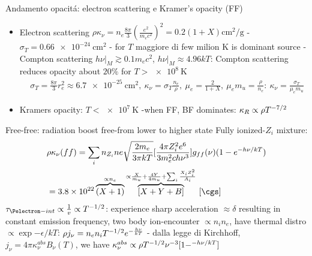\begin{frame}{Andamento opacit\'a: electron scattering e Kramer's opacity (FF)}
\begin{itemize}
\item Electron scattering $\rho\kappa_{\nu}=n_e\frac{8\pi}{3}(\frac{e^2}{m_ec^2})^2=0.2(1+X)\si{\square\cm\per\gram}$ - $\sigma_T=\SI{0.66e-24}{\square\cm}$ - for $T$ maggiore di few milion K is dominant source - Compton scattering $h\nu|_M\gtrsim0.1 m_ec^2$, $h\nu|_M\approx4.96kT$: Compton scattering reduces opacity about $20\%$ for $T>\SI{e8}{\kelvin}$
    \begin{align*}
        &\sigma_T=\frac{8\pi}{3}r_e^2\approx\SI{6.7e-25}{\square\cm},\ \kappa_{\nu}=\sigma_T \frac{n_e}{\rho},\ \mu_e=\frac{2}{1+X},\ \mu_em_u=\frac{\rho}{n_e}:\ \kappa_{\nu}=\frac{\sigma_T}{\mu_em_u}
    \end{align*}
\item Kramers opacity: $T<\SI{e7}{\kelvin}$ -when FF, BF dominates: $\kappa_R\propto\rho T^{-7/2}$
\end{itemize}
\begin{block}{Free-free: radiation boost free-\Pelectron from lower to higher state}
Fully ionized-$Z_i$ mixture: 
\begin{align*}
&\rho\kappa_{\nu}(ff)=\sum_in_{Z_i}ne\sqrt{\frac{2m_e}{3\pi kT}}[\frac{4\pi Z_i^2e^6}{3m_e^2ch\nu^3}]g_{ff}(\nu)(1-\exp{-h\nu/kT})\\
&=\num{3.8e22}\overbrace{(X+1)}^{\propto n_e}\overbrace{[X+Y+B]}^{\propto\frac{X}{m_u}+\frac{4Y}{4m_u}+\sum_i\frac{X_iZ_i^2}{A_i}}\ [\si{\cgs}]
\end{align*}
$\tau_{\Pelectron-int}\propto\frac{1}{v}\propto T\expy{-1/2}$: \Pelectron experience sharp acceleration $\approx\delta$ resulting in constant emission frequency, two body ion-\Pelectron encounter $\propto n_in_e$, \Pelectron have thermal distro $\propto\exp{-\epsilon/kT}$: $\rho j_{\nu}=n_en_iT^{-1/2}e^{-\frac{h\nu}{kT}}$ - dalla legge di Kirchhoff, $j_{\nu}=4\pi\kappa_{\nu}^{abs}B_{\nu}(T)$, we have $\kappa_{\nu}^{abs}\propto\rho T^{-1/2}\nu^{-3}[1-^{-h\nu/kT}]$
\end{block}
\end{frame}

